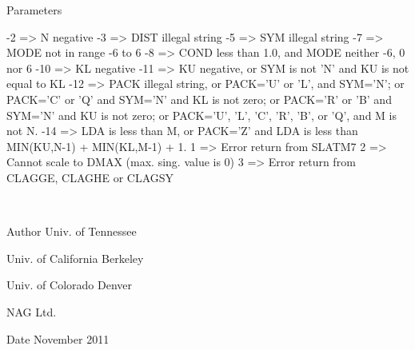 \begin{DoxyParams}[1]{Parameters}
\begin{DoxyVerb}
            -2 => N negative
            -3 => DIST illegal string
            -5 => SYM illegal string
            -7 => MODE not in range -6 to 6
            -8 => COND less than 1.0, and MODE neither -6, 0 nor 6
           -10 => KL negative
           -11 => KU negative, or SYM is not 'N' and KU is not equal to
                  KL
           -12 => PACK illegal string, or PACK='U' or 'L', and SYM='N';
                  or PACK='C' or 'Q' and SYM='N' and KL is not zero;
                  or PACK='R' or 'B' and SYM='N' and KU is not zero;
                  or PACK='U', 'L', 'C', 'R', 'B', or 'Q', and M is not
                  N.
           -14 => LDA is less than M, or PACK='Z' and LDA is less than
                  MIN(KU,N-1) + MIN(KL,M-1) + 1.
            1  => Error return from SLATM7
            2  => Cannot scale to DMAX (max. sing. value is 0)
            3  => Error return from CLAGGE, CLAGHE or CLAGSY\end{DoxyVerb}
 \\
\hline
\end{DoxyParams}
\begin{DoxyAuthor}{Author}
Univ. of Tennessee 

Univ. of California Berkeley 

Univ. of Colorado Denver 

N\+A\+G Ltd. 
\end{DoxyAuthor}
\begin{DoxyDate}{Date}
November 2011 
\end{DoxyDate}
